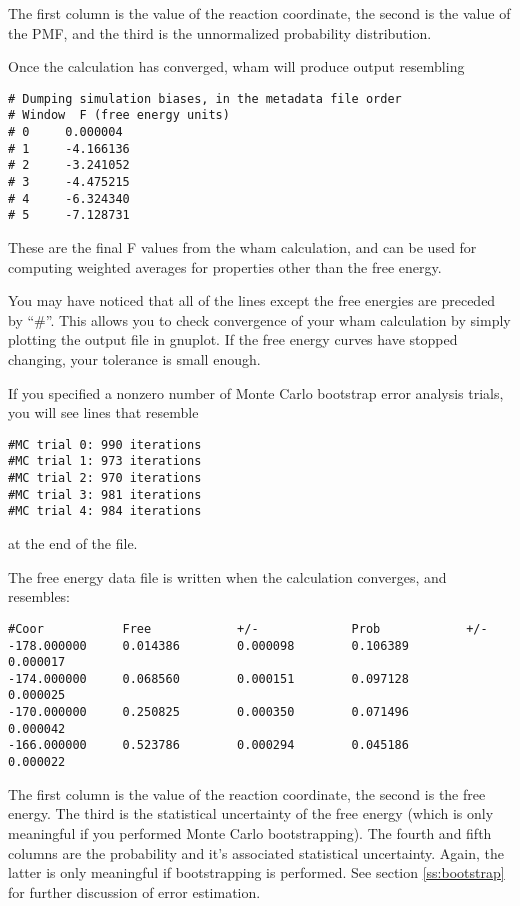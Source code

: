 \documentclass[12pt]{article}
\begin{document}
The first column is the value of the reaction coordinate, the second is the
value of the PMF, and the third is the unnormalized probability
distribution.

Once the calculation has converged, wham will produce output resembling

\begin{verbatim}
# Dumping simulation biases, in the metadata file order 
# Window  F (free energy units)
# 0     0.000004
# 1     -4.166136
# 2     -3.241052
# 3     -4.475215
# 4     -6.324340
# 5     -7.128731
\end{verbatim}

These are the final F values from the wham calculation, and can be used for
computing weighted averages for properties other than the free energy.

You may have noticed that all of the lines except the free energies are
preceded by ``\#''.  This allows you to check convergence of your wham
calculation by simply plotting the output file in gnuplot.  If the free
energy curves have stopped changing, your tolerance is small enough.  

If you specified a nonzero number of Monte Carlo bootstrap error analysis
trials, you will see lines that resemble

\begin{verbatim}
#MC trial 0: 990 iterations
#MC trial 1: 973 iterations
#MC trial 2: 970 iterations
#MC trial 3: 981 iterations
#MC trial 4: 984 iterations
\end{verbatim}

at the end of the file.

The free energy data file is written when the calculation converges, and
resembles: 

\begin{verbatim}
#Coor           Free            +/-             Prob            +/-
-178.000000     0.014386        0.000098        0.106389        0.000017
-174.000000     0.068560        0.000151        0.097128        0.000025
-170.000000     0.250825        0.000350        0.071496        0.000042
-166.000000     0.523786        0.000294        0.045186        0.000022
\end{verbatim}

The first column is the value of the reaction coordinate, the second is the
free energy.  The third is the statistical uncertainty of the free energy
(which is only meaningful if you performed Monte Carlo bootstrapping).  The
fourth and fifth columns are the probability and it's associated
statistical uncertainty.  Again, the latter is only meaningful if
bootstrapping is performed.  See section \ref{ss:bootstrap} for further
discussion of error estimation.
\end{document}
